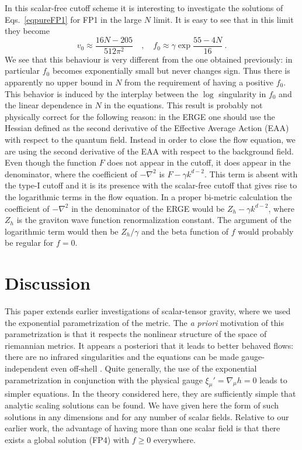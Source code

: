 \documentclass[11pt]{book} %
\newcommand{\be}{\begin{equation}}
\newcommand{\ee}{\end{equation}}
\begin{document}
In this scalar-free cutoff scheme it is interesting to investigate the solutions of
Eqs.~\eqref{eqpureFP1} for FP1 in the large $N$ limit.
It is easy to see that in this limit they become
\be
v_0\approx \frac{16N-205}{512\pi^2} \quad , \quad
f_0\approx \gamma\exp{\frac{55-4N}{16}}\ .
\ee
We see that this behaviour is very different from the one obtained previously:
in particular $f_0$ becomes exponentially small but never changes sign.
Thus there is apparently no upper bound in $N$ from the requirement of having a positive $f_0$.
This behavior is induced by the interplay between the $\log$ singularity
in $f_0$ and the linear dependence in $N$ in the equations.
This result is probably not physically correct for the following
reason: in the ERGE one should use the Hessian defined as the second
derivative of the Effective Average Action (EAA) with respect to the quantum field.
Instead in order to close the flow equation,
we are using the second derivative of the
EAA with respect to the background field.
Even though the function $F$ does not appear in the cutoff,
it does appear in the denominator, where the coefficient
of $-\nabla^2$ is $F-\gamma k^{d-2}$.
This term is absent with the type-I cutoff and
it is its presence with the scalar-free cutoff that gives rise
to the logarithmic terms in the flow equation.
In a proper bi-metric calculation the coefficient of
$-\nabla^2$ in the denominator of the ERGE
would be $Z_h-\gamma k^{d-2}$, where $Z_h$ is the graviton
wave function renormalization constant.
The argument of the logarithmic term would then be $Z_h/\gamma$
and the beta function of $f$ would probably be regular for $f=0$.

\section{Discussion}

This paper extends earlier investigations of scalar-tensor
gravity, where we used the exponential parametrization of the metric.
The {\it a priori} motivation of this parametrization is that
it respects the nonlinear structure of the space of riemannian metrics.
It appears a posteriori that it leads to better behaved flows:
there are no infrared singularities \cite{Percacci:2015wwa,Falls:2015qga}
and the equations can be made gauge-independent even off-shell
\cite{Falls:2015qga}.
Quite generally, the use of the exponential parametrization
in conjunction with the physical gauge $\xi_\mu'=\nabla_\mu h=0$
leads to simpler equations.
In the theory considered here, they are sufficiently simple
that analytic scaling solutions can be found.
We have given here the form of such solutions in any dimensions
and for any number of scalar fields.
Relative to our earlier work, the advantage of having more than
one scalar field is that there exists a global solution (FP4)
with $f\geq 0$ everywhere.
\end{document}
